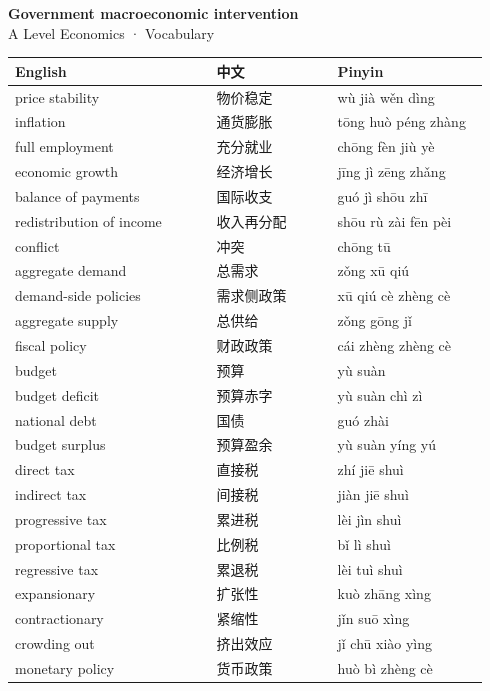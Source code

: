 \documentclass[11pt]{article}
\begin{document}
\begin{center}
  {\LARGE\bfseries Government macroeconomic intervention}\\[0.35em]
  {\large A Level Economics · Vocabulary}
\end{center}
\vspace{0.6em}

\begin{longtable}{@{}p{0.40\linewidth}p{0.24\linewidth}p{0.30\linewidth}@{}}
\toprule
\textbf{English} & \textbf{中文} & \textbf{Pinyin} \\
\midrule
\endhead
\bottomrule
\endlastfoot
price stability & 物价稳定 & wù jià wěn dìng \\
inflation & 通货膨胀 & tōng huò péng zhàng \\
full employment & 充分就业 & chōng fèn jiù yè \\
economic growth & 经济增长 & jīng jì zēng zhǎng \\
balance of payments & 国际收支 & guó jì shōu zhī \\
redistribution of income & 收入再分配 & shōu rù zài fēn pèi \\
conflict & 冲突 & chōng tū \\
aggregate demand & 总需求 & zǒng xū qiú \\
demand-side policies & 需求侧政策 & xū qiú cè zhèng cè \\
aggregate supply & 总供给 & zǒng gōng jǐ \\
fiscal policy & 财政政策 & cái zhèng zhèng cè \\
budget & 预算 & yù suàn \\
budget deficit & 预算赤字 & yù suàn chì zì \\
national debt & 国债 & guó zhài \\
budget surplus & 预算盈余 & yù suàn yíng yú \\
direct tax & 直接税 & zhí jiē shuì \\
indirect tax & 间接税 & jiàn jiē shuì \\
progressive tax & 累进税 & lèi jìn shuì \\
proportional tax & 比例税 & bǐ lì shuì \\
regressive tax & 累退税 & lèi tuì shuì \\
expansionary & 扩张性 & kuò zhāng xìng \\
contractionary & 紧缩性 & jǐn suō xìng \\
crowding out & 挤出效应 & jǐ chū xiào yìng \\
monetary policy & 货币政策 & huò bì zhèng cè \\

\end{longtable}
\end{document}

